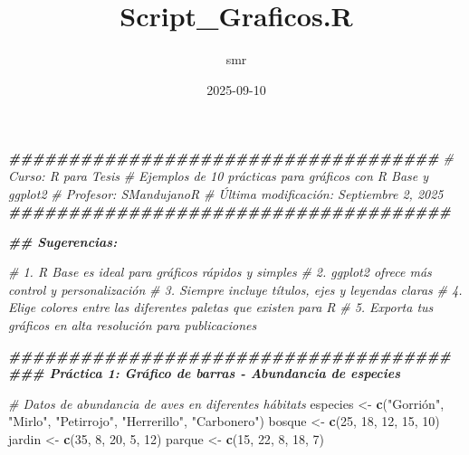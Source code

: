 \documentclass[
]{article}
\title{Script\_Graficos.R}
\author{smr}
\date{2025-09-10}
\newenvironment{Shaded}{\begin{snugshade}}{\end{snugshade}}
\newcommand{\CommentTok}[1]{\textcolor[rgb]{0.56,0.35,0.01}{\textit{#1}}}
\newcommand{\DecValTok}[1]{\textcolor[rgb]{0.00,0.00,0.81}{#1}}
\newcommand{\DocumentationTok}[1]{\textcolor[rgb]{0.56,0.35,0.01}{\textbf{\textit{#1}}}}
\newcommand{\FunctionTok}[1]{\textcolor[rgb]{0.13,0.29,0.53}{\textbf{#1}}}
\newcommand{\NormalTok}[1]{#1}
\newcommand{\OtherTok}[1]{\textcolor[rgb]{0.56,0.35,0.01}{#1}}
\newcommand{\StringTok}[1]{\textcolor[rgb]{0.31,0.60,0.02}{#1}}
\begin{document}
\maketitle

\begin{Shaded}
\begin{Highlighting}[]
\DocumentationTok{\#\#\#\#\#\#\#\#\#\#\#\#\#\#\#\#\#\#\#\#\#\#\#\#\#\#\#\#\#\#\#\#\#\#\#\#}
\CommentTok{\# Curso: R para Tesis}
\CommentTok{\# Ejemplos de 10 prácticas para gráficos con R Base y ggplot2}
\CommentTok{\# Profesor: SMandujanoR}
\CommentTok{\# Última modificación: Septiembre 2, 2025}
\DocumentationTok{\#\#\#\#\#\#\#\#\#\#\#\#\#\#\#\#\#\#\#\#\#\#\#\#\#\#\#\#\#\#\#\#\#\#\#\#\#}
  
\DocumentationTok{\#\# Sugerencias:}

\CommentTok{\# 1. R Base es ideal para gráficos rápidos y simples}
\CommentTok{\# 2. ggplot2 ofrece más control y personalización}
\CommentTok{\# 3. Siempre incluye títulos, ejes y leyendas claras}
\CommentTok{\# 4. Elige colores entre las diferentes paletas que existen para R}
\CommentTok{\# 5. Exporta tus gráficos en alta resolución para publicaciones}

\DocumentationTok{\#\#\#\#\#\#\#\#\#\#\#\#\#\#\#\#\#\#\#\#\#\#\#\#\#\#\#\#\#\#\#\#\#\#\#\#\#  }
\DocumentationTok{\#\#\# Práctica 1: Gráfico de barras {-} Abundancia de especies}

\CommentTok{\# Datos de abundancia de aves en diferentes hábitats}
\NormalTok{especies }\OtherTok{\textless{}{-}} \FunctionTok{c}\NormalTok{(}\StringTok{"Gorrión"}\NormalTok{, }\StringTok{"Mirlo"}\NormalTok{, }\StringTok{"Petirrojo"}\NormalTok{, }\StringTok{"Herrerillo"}\NormalTok{, }\StringTok{"Carbonero"}\NormalTok{)}
\NormalTok{bosque }\OtherTok{\textless{}{-}} \FunctionTok{c}\NormalTok{(}\DecValTok{25}\NormalTok{, }\DecValTok{18}\NormalTok{, }\DecValTok{12}\NormalTok{, }\DecValTok{15}\NormalTok{, }\DecValTok{10}\NormalTok{)}
\NormalTok{jardin }\OtherTok{\textless{}{-}} \FunctionTok{c}\NormalTok{(}\DecValTok{35}\NormalTok{, }\DecValTok{8}\NormalTok{, }\DecValTok{20}\NormalTok{, }\DecValTok{5}\NormalTok{, }\DecValTok{12}\NormalTok{)}
\NormalTok{parque }\OtherTok{\textless{}{-}} \FunctionTok{c}\NormalTok{(}\DecValTok{15}\NormalTok{, }\DecValTok{22}\NormalTok{, }\DecValTok{8}\NormalTok{, }\DecValTok{18}\NormalTok{, }\DecValTok{7}\NormalTok{)}


\end{Highlighting}
\end{Shaded}
\end{document}
